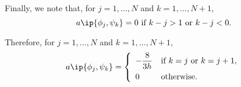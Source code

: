 \begin{solution}
\begin{enumerate}
\begin{enumerate}
Finally, we note that, for $j=1,\ldots,N$ and $k=1,\ldots,N+1$,
\[
a\ip{\phi_j,\psi_k}=0\mbox{ if }k-j>1\mbox{ or }k-j<0.
\]

Therefore, for $j=1,\ldots,N$ and $k=1,\ldots,N+1$,
\[
a\ip{\phi_j,\psi_k}=\left\{\begin{array}{ll}\displaystyle{-{8 \over 3h}} & \mbox{if }k=j\mbox{ or }k=j+1, \\[.75em] \displaystyle{0} & \mbox{otherwise}.\end{array}\right.
\]
\end{enumerate}
\end{enumerate}
\end{solution}

